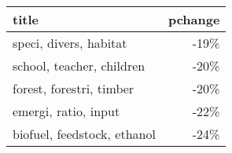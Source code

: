 \begin{tabular}{p{1.2cm}r}
\toprule
                       title &  pchange \\
\midrule
      speci, divers, habitat &     -19\% \\
   school, teacher, children &     -20\% \\
    forest, forestri, timber &     -20\% \\
        emergi, ratio, input &     -22\% \\
 biofuel, feedstock, ethanol &     -24\% \\
\bottomrule
\end{tabular}
